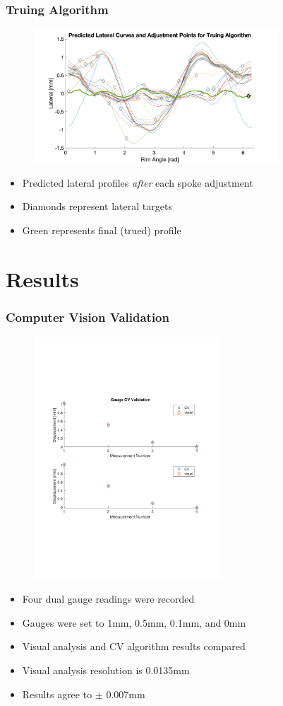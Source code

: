 \documentclass[mathserif]{beamer}
\begin{document}
\begin{frame}
\frametitle{Truing Algorithm}
\begin{figure}
    \includegraphics[height=5cm]{algorithm}
\end{figure}
\begin{itemize}
    \item Predicted lateral profiles \emph{after} each spoke adjustment
    \item Diamonds represent lateral targets
    \item Green represents final (trued) profile
\end{itemize}
\end{frame}

\section{Results}

\begin{frame}
\frametitle{Computer Vision Validation}
    \begin{figure}
    	\includegraphics[width=7cm,trim=0 200 0 200]{gaugeCV_validation}
    \end{figure}
    \begin{itemize}
    \item Four dual gauge readings were recorded
    \item Gauges were set to 1mm, 0.5mm, 0.1mm, and 0mm
    \item Visual analysis and CV algorithm results compared
    \item  Visual analysis resolution is 0.0135mm
    \item Results agree to $\pm$ 0.007mm
    \end{itemize}
\end{frame}
\end{document}
